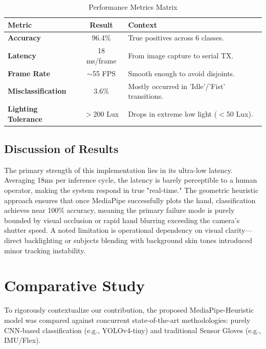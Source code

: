 \documentclass[conference]{IEEEtran}
\begin{document}
\begin{table}[H]
    \centering
    \caption{Performance Metrics Matrix}
    \label{tab:perf_metrics}
    \begin{tabularx}{\linewidth}{l c X}
        \toprule
        \textbf{Metric} & \textbf{Result} & \textbf{Context} \\ \midrule
        \textbf{Accuracy} & 96.4\% & True positives across 6 classes. \\
        \textbf{Latency} & 18 ms/frame & From image capture to serial TX. \\
        \textbf{Frame Rate} & $\sim$55 FPS & Smooth enough to avoid disjoints. \\
        \textbf{Misclassification} & 3.6\% & Mostly occurred in 'Idle'/'Fist' transitions. \\
        \textbf{Lighting Tolerance}& $>$200 Lux & Drops in extreme low light ($<$50 Lux). \\ \bottomrule
    \end{tabularx}
\end{table}

\subsection{Discussion of Results}
The primary strength of this implementation lies in its ultra-low latency. Averaging 18ms per inference cycle, the latency is barely perceptible to a human operator, making the system respond in true "real-time." The geometric heuristic approach ensures that once MediaPipe successfully plots the hand, classification achieves near 100\% accuracy, meaning the primary failure mode is purely bounded by visual occlusion or rapid hand blurring exceeding the camera's shutter speed. A noted limitation is operational dependency on visual clarity---direct backlighting or subjects blending with background skin tones introduced minor tracking instability. 

\section{Comparative Study}
To rigorously contextualize our contribution, the proposed MediaPipe-Heuristic model was compared against concurrent state-of-the-art methodologies: purely CNN-based classification (e.g., YOLOv4-tiny) and traditional Sensor Gloves (e.g., IMU/Flex).
\end{document}
